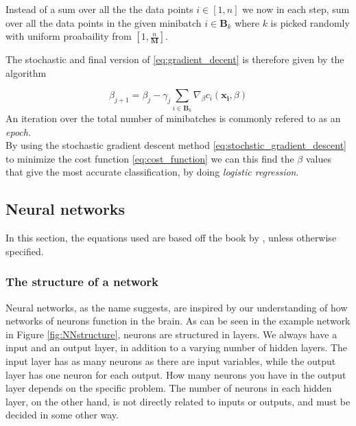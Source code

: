 Instead of a sum over all the the data points $i \in [1,n]$ we now in each step, sum over all the data points in the given minibatch $i \in \boldsymbol{B}_k$ where $k$ is picked randomly with uniform proabaility from $[1, \frac{n}{\boldsymbol{M}}]$.

The stochastic and final version of \eqref{eq:gradient_decent} is therefore given by the algorithm

\begin{equation}
    \beta_{j+1} = \beta_j - \gamma_j \sum_{i \in \boldsymbol{B}_k}\nabla_\beta c_i(\boldsymbol{x_i},\beta)
    \label{eq:stochstic_gradient_descent}
\end{equation}
An iteration over the total number of minibatches is commonly refered to as an \textit{epoch.}\\

By using the stochastic gradient descent method \eqref{eq:stochstic_gradient_descent} to minimize the cost function \eqref{eq:cost_function} we can this find the $\beta$ values that give the most accurate classification, by doing \textit{logistic regression}.

\subsection{Neural networks}
In this section, the equations used are based off the book by \cite{Nielsen}, unless otherwise specified.
\subsubsection*{The structure of a network}
Neural networks, as the name suggests, are inspired by our understanding of how networks of neurons function in the brain. As can be seen in the example network in Figure \ref{fig:NNstructure}, neurons are structured in layers. We always have a input and an output layer, in addition to a varying number of hidden layers. The input layer has as many neurons as there are input variables, while the output layer has one neuron for each output. How many neurons you have in the output layer depends on the specific problem. The number of neurons in each hidden layer, on the other hand, is not directly related to inputs or outputs, and must be decided in some other way.

